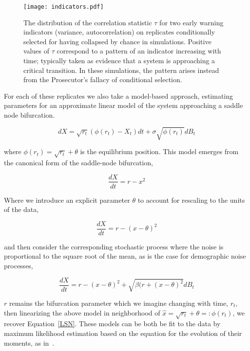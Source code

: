 \documentclass[authoryear,review,12pt]{elsarticle}
\begin{document}
\begin{figure}[H]
  \begin{center}
    \texttt{[image: indicators.pdf]}
  \end{center}
  \caption{The distribution of the correlation statistic $\tau$ for two early warning indicators (variance, autocorrelation) on replicates conditionally selected for having collapsed by chance in simulations. Positive values of $\tau$ correspond to a pattern of an indicator increasing with time; typically taken as evidence that a system is approaching a critical transition.  In these simulations, the pattern arises instead from the Prosecutor's fallacy of conditional selection.}
  \label{fig:indicator}
\end{figure}

For each of these replicates we also take a model-based approach, estimating 
parameters for an approximate linear model of the system approaching a
saddle node bifurcation.


\begin{equation}
  dX = \sqrt{ r_t } (\phi(r_t) - X_t) dt +
  \sigma\sqrt{\phi(r_t) } d B_t \label{LSN}
\end{equation}

where \( \phi(r_t) = \sqrt{r_t} +\theta \) is the equilibrium position.  
This model emerges from the canonical form of the saddle-node bifurcation,

\begin{equation}
  \frac{dX}{dt} = r - x^2
\end{equation}

Where we introduce an explicit parameter $\theta$ to account for rescaling
to the units of the data,

\begin{equation}
   \frac{dX}{dt} = r - (x-\theta)^2
\end{equation}

and then consider the corresponding stochastic process where the noise is
proportional to the square root of the mean, as is the case for demographic
noise processes,

\begin{equation}
  \frac{dX}{dt} = r - (x-\theta)^2 + \sqrt{ \beta (r + (x-\theta)^2 } dB_t
\end{equation}

$r$ remains the bifurcation parameter which we imagine changing with time,
$r_t$, then linearizing the above model in neighborhood of
\(\hat x = \sqrt{r_t} +\theta =: \phi(r_t)\), we recover Equation~\eqref{LSN}.
These models can be both be fit to the data by maximum likelihood estimation
based on the equation for the evolution of their moments, as
in~\citet{Boettiger2012b}.  
\end{document}
